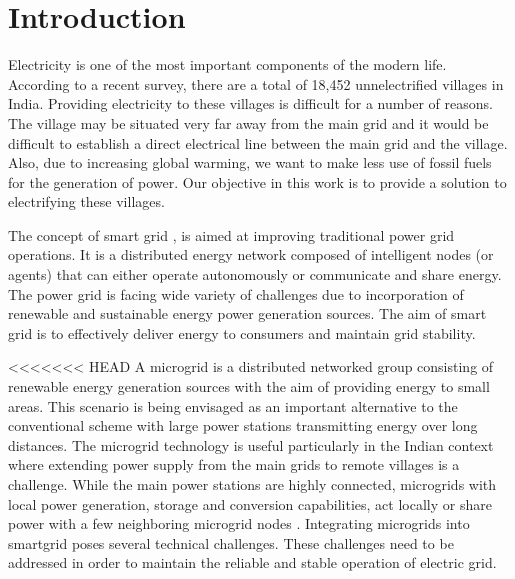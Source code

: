 \documentclass[conference]{IEEEtran}
\begin{document}




%
\IEEEpeerreviewmaketitle



\section{Introduction}

Electricity is one of the most important components of the modern life. According to a recent survey, there are a total of 18,452 unnelectrified villages in India. Providing electricity to these villages is difficult for a number of reasons. The village may be situated very far away from the main grid and it would be difficult to establish a direct electrical line between the main grid and the village. Also, due to increasing global warming, we want to make less use of fossil fuels for the generation of power. Our objective in this work is to provide a solution to electrifying these villages.

The concept of smart grid \cite{weiss1999multiagent}, is aimed at improving traditional power grid operations.  It is a distributed energy network composed of intelligent nodes (or agents) that can either operate autonomously or communicate and share energy. The  power grid is facing wide variety of challenges due to incorporation of renewable and sustainable energy power generation sources. The aim of smart grid is to effectively deliver energy to consumers and maintain grid stability.

<<<<<<< HEAD
A microgrid is a distributed networked group consisting of renewable energy generation sources with the aim of providing energy to small areas. This scenario is being envisaged as an important alternative to the conventional scheme with large power stations transmitting energy over long distances. The microgrid technology is useful particularly in the Indian context where extending power supply from the main grids to remote villages is a challenge. While the main power stations are highly connected, microgrids with local power generation, storage and conversion capabilities, act locally or share power with a few neighboring microgrid nodes \cite{farhangi2010path}.
Integrating microgrids into smartgrid poses several technical challenges. These challenges need to be addressed in order to maintain the reliable and stable operation of electric grid.
\end{document}
